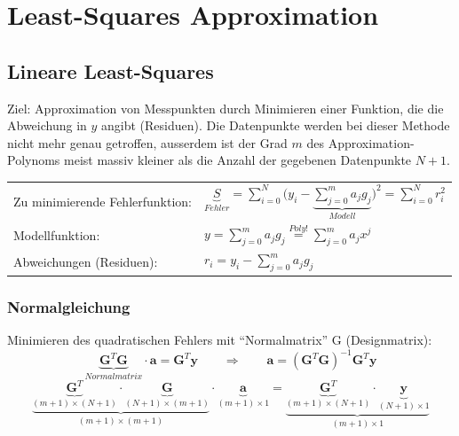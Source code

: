 \section{Least-Squares Approximation}
\subsection{Lineare Least-Squares}
Ziel: Approximation von Messpunkten durch Minimieren einer Funktion, die die Abweichung in $y$ 
angibt (Residuen). Die Datenpunkte werden bei dieser Methode nicht mehr genau getroffen, ausserdem ist der Grad $m$ des Approximation-Polynoms meist massiv kleiner als die Anzahl der gegebenen Datenpunkte $N+1$.\\

\begin{minipage}[c]{12.5cm}
	\begin{tabular}{ll}
		Zu minimierende Fehlerfunktion:
		&$\boxed{\underbrace{S}_{Fehler}=\sum\limits_{i=0}^{N}{\big(y_i - \underbrace{\sum\limits_{j=0}^{m}{a_j g_j}}_{Modell}\big)^2} = \sum\limits_{i=0}^{N}{ r_i^2}}$\\
		Modellfunktion: 
		&$\boxed{y=\sum\limits_{j=0}^{m}{a_j g_j}}\overset{Poly!}{=}\sum\limits_{j=0}^{m}{a_j x^j}$\\
		Abweichungen (Residuen): 
		&$r_i=y_i-\sum\limits_{j=0}^{m}{a_j g_j}$
	\end{tabular}
	
	\subsubsection{Normalgleichung}
	
	Minimieren des quadratischen Fehlers mit "`Normalmatrix"' G (Designmatrix):
	$$\underbrace{\bm{G}^T \bm{G}}_{Normalmatrix}\cdot \bm{a} = \bm{G}^T \bm{y} \qquad \Rightarrow \qquad \bm{a}=(\bm{G}^T \bm{G})^{-1}\bm{G}^T \bm{y}$$
	$$\underbrace{\underbrace{\bm{G}^T}_{(m+1)\times(N+1)} \cdot \underbrace{\bm{G}}_{(N+1)\times(m+1)}}_{(m+1)\times(m+1)}\cdot
	  \underbrace{\bm{a}}_{(m+1)\times 1}=
	  \underbrace{\underbrace{\bm{G}^T}_{(m+1)\times(N+1)}\cdot\underbrace{\bm{y}}_{(N+1)\times 1}}_{(m+1)\times 1}$$
\end{minipage}
\hfill
